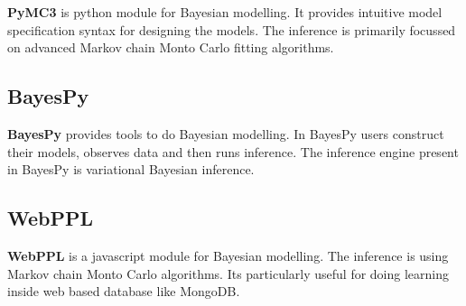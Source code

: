 \textbf{PyMC3} is python module for Bayesian modelling. It provides intuitive model specification syntax for designing the models. The inference is primarily focussed on advanced Markov chain Monto Carlo fitting algorithms.


\subsection{BayesPy}

\textbf{BayesPy} provides tools to do Bayesian modelling. In BayesPy users construct their models, observes data and then runs inference. The inference engine present in BayesPy is variational Bayesian inference.

\subsection{WebPPL}

\textbf{WebPPL} is a javascript module for Bayesian modelling. The inference is using Markov chain Monto Carlo algorithms. Its particularly useful for doing learning inside web based database like MongoDB.
